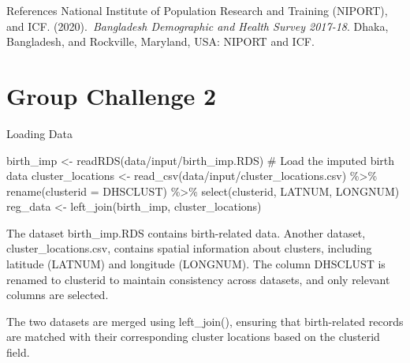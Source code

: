 \documentclass[
  ignorenonframetext,
]{beamer}
\newenvironment{Shaded}{\begin{snugshade}}{\end{snugshade}}
\newcommand{\AttributeTok}[1]{\textcolor[rgb]{0.40,0.45,0.13}{#1}}
\newcommand{\CommentTok}[1]{\textcolor[rgb]{0.37,0.37,0.37}{#1}}
\newcommand{\FunctionTok}[1]{\textcolor[rgb]{0.28,0.35,0.67}{#1}}
\newcommand{\NormalTok}[1]{\textcolor[rgb]{0.00,0.23,0.31}{#1}}
\newcommand{\OtherTok}[1]{\textcolor[rgb]{0.00,0.23,0.31}{#1}}
\newcommand{\SpecialCharTok}[1]{\textcolor[rgb]{0.37,0.37,0.37}{#1}}
\newcommand{\StringTok}[1]{\textcolor[rgb]{0.13,0.47,0.30}{#1}}
\begin{document}
\begin{frame}{References}
\label{references}
National Institute of Population Research and Training (NIPORT), and
ICF. (2020).~\emph{Bangladesh Demographic and Health Survey 2017-18}.
Dhaka, Bangladesh, and Rockville, Maryland, USA: NIPORT and ICF.
\end{frame}

\section{Group Challenge 2}\label{group-challenge-2}

\begin{frame}[fragile]{Loading Data}
\label{loading-data}
\begin{Shaded}
\begin{Highlighting}[]
\NormalTok{birth\_imp }\OtherTok{\textless{}{-}} \FunctionTok{readRDS}\NormalTok{(}\StringTok{\textquotesingle{}data/input/birth\_imp.RDS\textquotesingle{}}\NormalTok{) }\CommentTok{\# Load the imputed birth data}
\NormalTok{cluster\_locations }\OtherTok{\textless{}{-}} \FunctionTok{read\_csv}\NormalTok{(}\StringTok{\textquotesingle{}data/input/cluster\_locations.csv\textquotesingle{}}\NormalTok{) }\SpecialCharTok{\%\textgreater{}\%} 
  \FunctionTok{rename}\NormalTok{(}\AttributeTok{clusterid =}\NormalTok{ DHSCLUST) }\SpecialCharTok{\%\textgreater{}\%} 
  \FunctionTok{select}\NormalTok{(clusterid, LATNUM, LONGNUM)}
\NormalTok{reg\_data }\OtherTok{\textless{}{-}} \FunctionTok{left\_join}\NormalTok{(birth\_imp, cluster\_locations)}
\end{Highlighting}
\end{Shaded}

The dataset birth\_imp.RDS contains birth-related data. Another dataset,
cluster\_locations.csv, contains spatial information about clusters,
including latitude (LATNUM) and longitude (LONGNUM). The column DHSCLUST
is renamed to clusterid to maintain consistency across datasets, and
only relevant columns are selected.

The two datasets are merged using left\_join(), ensuring that
birth-related records are matched with their corresponding cluster
locations based on the clusterid field.
\end{frame}
\end{document}
